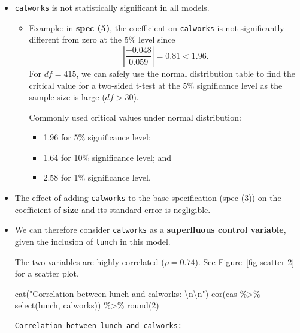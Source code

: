 \documentclass[
  12pt,
  letterpaper,
]{scrbook}
\newenvironment{Shaded}{\begin{snugshade}}{\end{snugshade}}
\newcommand{\DecValTok}[1]{\textcolor[rgb]{0.68,0.00,0.00}{#1}}
\newcommand{\FunctionTok}[1]{\textcolor[rgb]{0.28,0.35,0.67}{#1}}
\newcommand{\NormalTok}[1]{\textcolor[rgb]{0.00,0.23,0.31}{#1}}
\newcommand{\SpecialCharTok}[1]{\textcolor[rgb]{0.37,0.37,0.37}{#1}}
\newcommand{\StringTok}[1]{\textcolor[rgb]{0.13,0.47,0.30}{#1}}
\providecommand{\tightlist}{%
  \setlength{\itemsep}{0pt}\setlength{\parskip}{0pt}}
\renewcommand{\tightlist}{\setlength{\itemsep}{0.5\baselineskip}\setlength{\parskip}{0.2\baselineskip}}
\theoremstyle{definition}
\theoremstyle{plain}
\theoremstyle{remark}
\begin{document}
\begin{itemize}
\item
  \texttt{calworks} is not statistically significant in all models.

  \begin{itemize}
  \item
    Example: in \textbf{spec (5)}, the coefficient on \texttt{calworks}
    is not significantly different from zero at the 5\% level since \[
    \left|\frac{-0.048}{0.059}\right| = 0.81 < 1.96.
    \] For \(df = 415\), we can safely use the normal distribution table
    to find the critical value for a two-sided t-test at the 5\%
    significance level as the sample size is large (\(df>30\)).

    Commonly used critical values under normal distribution:

    \begin{itemize}
    \tightlist
    \item
      {1.96 for 5\% significance level;}
    \item
      1.64 for 10\% significance level; and
    \item
      2.58 for 1\% significance level.
    \end{itemize}
  \end{itemize}
\item
  The effect of adding \texttt{calworks} to the base specification (spec
  (3)) on the coefficient of \textbf{size} and its standard error is
  negligible.
\item
  We can therefore consider \texttt{calworks} as a \textbf{superfluous
  control variable}, given the inclusion of \texttt{lunch} in this
  model.

  The two variables are highly correlated (\(\rho = 0.74\)). See
  Figure~\ref{fig-scatter-2} for a scatter plot.

\begin{Shaded}
\begin{Highlighting}[]
\FunctionTok{cat}\NormalTok{(}\StringTok{"Correlation between lunch and calworks: }\SpecialCharTok{\textbackslash{}n\textbackslash{}n}\StringTok{"}\NormalTok{)}
\FunctionTok{cor}\NormalTok{(cas }\SpecialCharTok{\%\textgreater{}\%} \FunctionTok{select}\NormalTok{(lunch, calworks)) }\SpecialCharTok{\%\textgreater{}\%} \FunctionTok{round}\NormalTok{(}\DecValTok{2}\NormalTok{)}
\end{Highlighting}
\end{Shaded}

\begin{verbatim}
Correlation between lunch and calworks: 


\end{verbatim}
\end{itemize}
\end{document}
